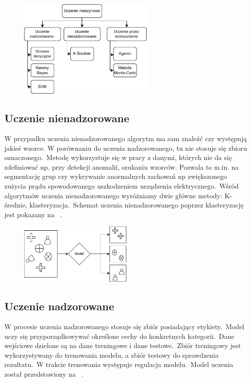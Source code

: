 \begin{figure}[H]
    \centering
    \includegraphics[width=0.6\textwidth]{images/ml-przyklady}
    \label{fig:ml-schema}
\end{figure}

\subsection{Uczenie nienadzorowane}
W przypadku uczenia nienadzorowanego algorytm ma sam znaleźć czy występują jakieś wzorce. W porównaniu do uczenia nadzorowanego, tu nie stosuje się zbioru oznaczonego.\ Metodę wykorzystuje się w pracy z danymi, których nie da się zdefiniować np. przy detekcji anomalii, szukaniu wzorców. Pozwala to m.in. na segmentację grup czy wykrywanie anormalnych zachowań np zwiększonego zużycia prądu spowodowanego uszkodzeniem urządzenia elektrycznego.\ Wśród algorytmów uczenia nienadzorowanego wyróżniamy dwie główne metody: K-średnie, klasteryzacja.\ Schemat uczenia nienadzorowanego poprzez klasteryzację jest pokazany na ~\cite{AiScience, Mahesh2018}.

\begin{figure}[H]
    \centering
    \includegraphics[width=0.5\textwidth]{images/unsupervised}
    \label{fig:unspervised}
\end{figure}


\subsection{Uczenie nadzorowane}
W procesie uczenia nadzorowanego stosuje się zbiór posiadający etykiety.\ Model uczy się przyporządkowywać określone cechy do konkretnych kategorii.\ Dane wejściowe dzielone są na dane treningowe i dane testowe.\ Zbiór treningowy jest wykorzystywany do trenowania modelu, a zbiór testowy do sprawdzenia rezultatu.\ W trakcie trenowania występuje regulacja modelu.\ Model uczenia został przedstawiony na ~\cite{AiScience, Mahesh2018}.

